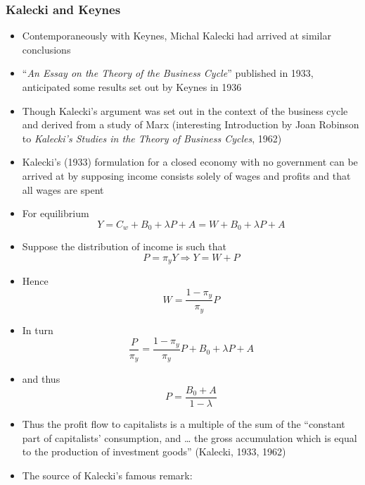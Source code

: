 \documentclass[a4paper,twoside]{article}
\numberwithin{equation}{section}
\numberwithin{figure}{section}
\begin{document}
\subsubsection{Kalecki and Keynes}
	\begin{itemize}
		\item Contemporaneously with Keynes, Michal Kalecki had arrived at similar conclusions
		\item ``\textit{An Essay on the Theory of the Business Cycle}'' published in 1933, anticipated some results set out by Keynes in 1936
		\item Though Kalecki's argument was set out in the context of the business cycle and derived from a study of Marx (interesting Introduction by Joan Robinson to \textit{Kalecki's Studies in the Theory of Business Cycles}, 1962)
		\item Kalecki's (1933) formulation for a closed economy with no government can be arrived at by supposing income consists solely of wages and profits and that all wages are spent
		\item For equilibrium
		\begin{equation}
			Y = C_w + B_0 + \lambda P + A = W + B_0 + \lambda P + A \label{E:4.1}
		\end{equation}
		\item Suppose the distribution of income is such that
		\begin{equation}
			P = \pi_y Y \Rightarrow Y = W + P \label{E:4.2}
		\end{equation}
		\item Hence
		\begin{equation}
			W = \frac{1-\pi_y}{\pi_y} P \label{E:4.3}
		\end{equation}
		\item In turn
		\begin{equation}
			\frac{P}{\pi_y} = \frac{1-\pi_y}{\pi_y}P+B_0+ \lambda P + A \label{E:4.4}
		\end{equation}
		\item and thus
		\begin{equation}
			P = \frac{B_0+A}{1-\lambda} \label{E:4.5}
		\end{equation}
		\item Thus the profit flow to capitalists is a multiple of the sum of the ``constant part of capitalists' consumption, and \dots\: the gross accumulation which is equal to the production of investment goods'' (Kalecki, 1933, 1962)
		\item The source of Kalecki's famous remark:

\end{itemize}
\end{document}
